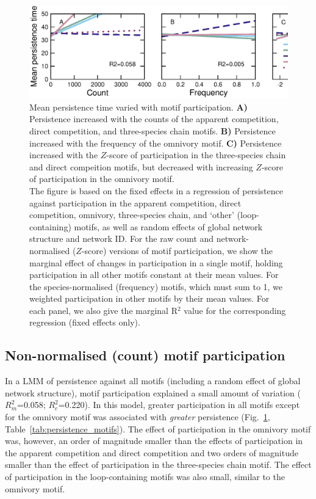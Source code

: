 \documentclass[12pt]{article}
\begin{document}
    \begin{figure}[ht!]
        \centering
        \includegraphics[width=\textwidth]{figures/roles/persistence_vs_motifs.eps}
        \caption{Mean persistence time varied with motif participation. \textbf{A)} Persistence increased with the counts of the apparent competition, direct competition, and three-species chain motifs. \textbf{B)} Persistence increased with the frequency of the omnivory motif. \textbf{C)} Persistence increased with the $Z$-score of participation in the three-species chain and direct compeition motifs, but decreased with increasing $Z$-score of participation in the omnivory motif. \\The figure is based on the fixed effects in a regression of persistence against participation in the apparent competition, direct competition, omnivory, three-species chain, and `other' (loop-containing) motifs, as well as random effects of global network structure and network ID. For the raw count and network-normalised ($Z$-score) versions of motif participation, we show the marginal effect of changes in participation in a single motif, holding participation in all other motifs constant at their mean values. For the species-normalised (frequency) motifs, which must sum to 1, we weighted participation in other motifs by their mean values. For each panel, we also give the marginal R$^2$ value for the corresponding regression (fixed effects only).}
        \label{fig:persistence_motifs}
	    \end{figure}

	
	\subsection*{Non-normalised (count) motif participation}

		In a LMM of persistence against all motifs (including a random effect of global network structure), motif participation explained a small amount of variation ($R^{2}_m$=0.058; $R^2_c$=0.220).
		In this model, greater participation in all motifs except for the omnivory motif was associated with \emph{greater} persistence (Fig.~\ref{fig:persistence_motifs}, Table~\ref{tab:persistence_motifs}).
		The effect of participation in the omnivory motif was, however, an order of magnitude smaller than the effects of participation in the apparent competition and direct competition and two orders of magnitude smaller than the effect of participation in the three-species chain motif.
		The effect of participation in the loop-containing motifs was also small, similar to the omnivory motif.
\end{document}
